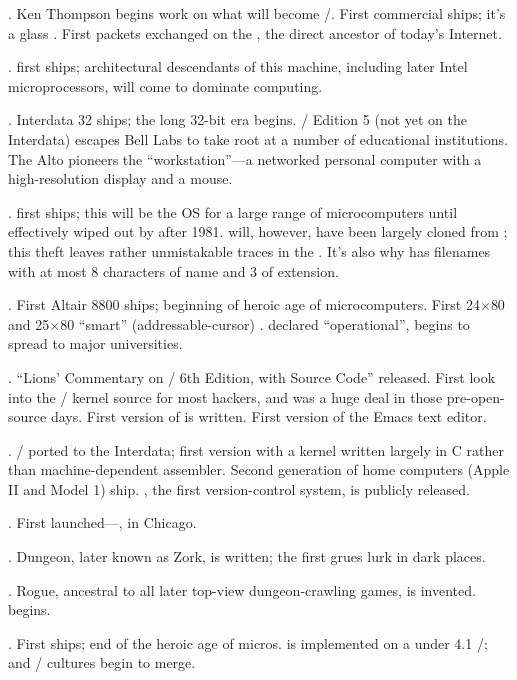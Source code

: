 .
Ken Thompson begins work on what will become \UNIX/. First commercial  ships;
it's a glass . First packets exchanged on the , the direct ancestor
of today's Internet.

.
 first ships; architectural descendants of this machine, including
later Intel microprocessors, will come to dominate computing.

.
Interdata 32 ships; the long 32-bit era begins. \UNIX/ Edition 5 (not yet on
the Interdata) escapes Bell Labs to take root at a number of educational
institutions. The  Alto pioneers the ``workstation''---a networked personal
computer with a high-resolution display and a mouse.

.
 first ships; this will be the OS for a large range of microcomputers until
effectively wiped out by  after 1981.  will, however, have been
largely cloned from ; this theft leaves rather unmistakable traces in the
. It's also why  has filenames with at most 8 characters of name and
3 of extension.

.
First Altair 8800 ships; beginning of heroic age of microcomputers. First 24$\times$80
and 25$\times$80 ``smart'' (addressable-cursor) .  declared ``operational'',
begins to spread to major universities.

.
``Lions' Commentary on \UNIX/ 6th Edition, with Source Code'' released. First look
into the \UNIX/ kernel source for most hackers, and was a huge deal in those
pre-open-source days. First version of  is written. First version of the
Emacs text editor.

.
\UNIX/ ported to the Interdata; first version with a kernel written largely in C
rather than machine-dependent assembler. Second generation of home computers
(Apple II and  Model 1) ship. , the first version-control system, is
publicly released.

.
First  launched---, in Chicago.

.
 Dungeon, later known as Zork, is written; the first grues lurk in dark
places.

.
Rogue, ancestral to all later top-view dungeon-crawling games, is invented.
 begins.

.
First  ships; end of the heroic age of micros.  is implemented on a
 under 4.1 \UNIX/;  and \UNIX/ cultures begin to merge.

